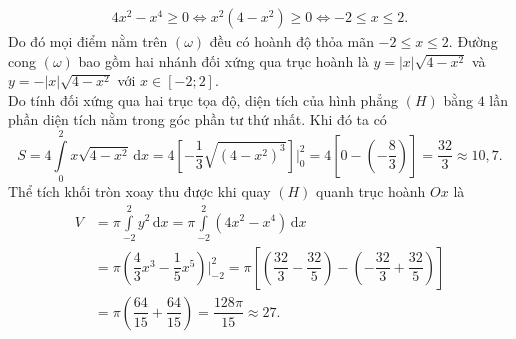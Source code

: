 \begin{ex}
{\begin{itemchoice}
			\allowdisplaybreaks
			\begin{align*}
				4x^2 - x^4 \ge 0 \Leftrightarrow x^2\left(4 - x^2\right) \ge 0 \Leftrightarrow -2 \le x \le 2.
			\end{align*}
			Do đó mọi điểm nằm trên $(\omega)$ đều có hoành độ thỏa mãn $-2\le x\le 2$.
			\itemch Đường cong $(\omega)$ bao gồm hai nhánh đối xứng qua trục hoành là $y = |x|\sqrt{4-x^2}$ và $y = -|x|\sqrt{4-x^2}$ với $x\in[-2;2]$.\\
			Do tính đối xứng qua hai trục tọa độ, diện tích của hình phẳng $(H)$ bằng $4$ lần phần diện tích nằm trong góc phần tư thứ nhất. Khi đó ta có
			\[S = 4\displaystyle\int\limits_{0}^{2} x\sqrt{4-x^2} \mathrm{\,d}x = 4 \left[-\dfrac{1}{3}\sqrt{\left(4-x^2\right)^3} \right] \Bigg|_0^2 = 4 \left[0 - \left(-\dfrac{8}{3}\right) \right] = \dfrac{32}{3} \approx 10{,}7. \]
			\itemch Thể tích khối tròn xoay thu được khi quay $(H)$ quanh trục hoành $Ox$ là
			\allowdisplaybreaks
			\begin{align*}
				V &= \pi \displaystyle\int\limits_{-2}^{2} y^2 \mathrm{\,d}x = \pi \displaystyle\int\limits_{-2}^{2}\left(4x^2 - x^4\right) \mathrm{\,d}x \\
				&= \pi \left(\dfrac{4}{3}x^3 - \dfrac{1}{5}x^5 \right) \Bigg|_{-2}^{2} = \pi \left[\left(\dfrac{32}{3} - \dfrac{32}{5} \right) - \left(-\dfrac{32}{3} + \dfrac{32}{5} \right) \right] \\
				&= \pi \left(\dfrac{64}{15} + \dfrac{64}{15} \right) = \dfrac{128\pi}{15} \approx 27.
			\end{align*}
		\end{itemchoice}
	}
\end{ex}

